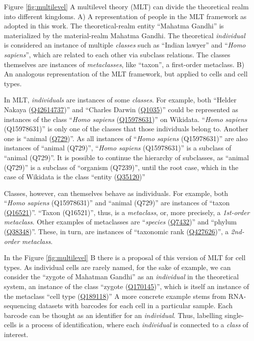 Figure \ref{fig:multilevel} A multilevel theory (MLT) can divide the theoretical realm into different kingdoms. A) A representation of people in the MLT framework as adopted in this work. The theoretical-realm entity ``Mahatma Gandhi'' is materialized by the material-realm Mahatma Gandhi. The theoretical \emph{individual} is considered an instance of multiple \emph{classes} such as ``Indian lawyer'' and ``\emph{Homo sapiens}'', which are related to each other via subclass relations. The classes themselves are instances of \emph{metaclasses}, like ``taxon'', a first-order metaclass. B) An analogous representation of the MLT framework, but applied to cells and cell types.

In MLT, \emph{individuals} are instances of some \emph{classes}.
For example, both ``Helder Nakaya (\href{https://www.wikidata.org/wiki/Q42614737}{Q42614737})'' and ``Charles Darwin (\href{https://www.wikidata.org/wiki/Q42614737}{Q1035})'' could be represented as instances of the class ``\emph{Homo sapiens} (\href{https://www.wikidata.org/wiki/Q15978631}{Q15978631})'' on Wikidata.
``\emph{Homo sapiens} (Q15978631)'' is only one of the classes that those individuals belong to.
Another one is ``animal (\href{https://www.wikidata.org/wiki/Q729}{Q729})''.
As all instances of ``\emph{Homo sapiens} (Q15978631)'' are also instances of ``animal (Q729)'', ``\emph{Homo sapiens} (Q15978631)'' is a subclass of ``animal (Q729)''.
It is possible to continue the hierarchy of subclasses, as ``animal (Q729)'' is a subclass of ``organism (Q7239)'', until the root case, which in the case of Wikidata is the class ``entity (\href{https://www.wikidata.org/wiki/Q35120}{Q35120})''

Classes, however, can themselves behave as individuals.
For example, both ``\emph{Homo sapiens} (Q15978631)'' and ``animal (Q729)'' are instances of ``taxon (\href{https://www.wikidata.org/wiki/Q16521}{Q16521})''.
``Taxon (Q16521)'', thus, is a \emph{metaclass}, or, more precisely, a \emph{1st-order metaclass}.
Other examples of metaclasses are ``\emph{species} (\href{https://www.wikidata.org/wiki/Q7432}{Q7432})'' and ``phylum (\href{https://www.wikidata.org/wiki/Q38348}{Q38348})''.
These, in turn, are instances of ``taxonomic rank (\href{https://www.wikidata.org/wiki/Q427626}{Q427626})'', a \emph{2nd-order metaclass}.

In the Figure \ref{fig:multilevel} B there is a proposal of this version of MLT for cell types.
As individual cells are rarely named, for the sake of example, we can consider the ``zygote of Mahatman Gandhi'' as an \emph{individual} in the theoretical system, an instance of the class ``zygote (\href{https://www.wikidata.org/wiki/Q170145}{Q170145})'', which is itself an instance of the metaclass ``cell type (\href{https://www.wikidata.org/wiki/Q189118}{Q189118})''
A more concrete example stems from RNA-sequencing datasets with barcodes for each cell in a particular sample.
Each barcode can be thought as an identifier for an \emph{individual}.
Thus, labelling single-cells is a process of identification, where each \emph{individual} is connected to a \emph{class} of interest.


